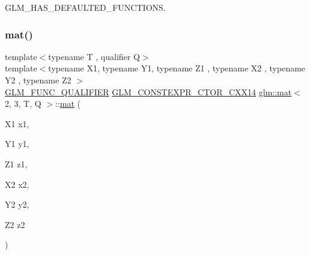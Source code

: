 G\+L\+M\+\_\+\+H\+A\+S\+\_\+\+D\+E\+F\+A\+U\+L\+T\+E\+D\+\_\+\+F\+U\+N\+C\+T\+I\+O\+NS. 

\mbox{\label{structglm_1_1mat_3_012_00_013_00_01_t_00_01_q_01_4_a12429e3e8f84a37878a67490604c7173}} 
\subsubsection{\texorpdfstring{mat()}{mat()}\hspace{0.1cm}{\footnotesize\ttfamily [19/21]}}
{\footnotesize\ttfamily template$<$typename T , qualifier Q$>$ \\
template$<$typename X1, typename Y1, typename Z1 , typename X2 , typename Y2 , typename Z2 $>$ \\
\mbox{\hyperlink{setup_8hpp_a33fdea6f91c5f834105f7415e2a64407}{G\+L\+M\+\_\+\+F\+U\+N\+C\+\_\+\+Q\+U\+A\+L\+I\+F\+I\+ER}} \mbox{\hyperlink{setup_8hpp_a0900f9145e68bf6061b6f5e7be3fa751}{G\+L\+M\+\_\+\+C\+O\+N\+S\+T\+E\+X\+P\+R\+\_\+\+C\+T\+O\+R\+\_\+\+C\+X\+X14}} \mbox{\hyperlink{structglm_1_1mat}{glm\+::mat}}$<$ 2, 3, T, Q $>$\+::\mbox{\hyperlink{structglm_1_1mat}{mat}} (\begin{DoxyParamCaption}\item[{X1}]{x1,  }\item[{Y1}]{y1,  }\item[{Z1}]{z1,  }\item[{X2}]{x2,  }\item[{Y2}]{y2,  }\item[{Z2}]{z2 }\end{DoxyParamCaption})}

\mbox{\label{structglm_1_1mat_3_012_00_013_00_01_t_00_01_q_01_4_a3e0d4479b6a5787d1d6116514c10cb0b}} 
